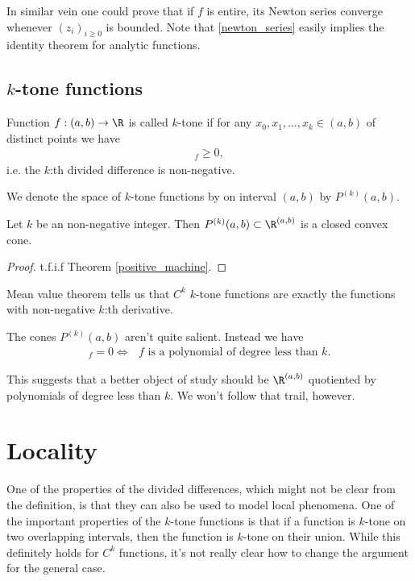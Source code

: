 In similar vein one could prove that if $f$ is entire, its Newton series converge whenever $(z_{i})_{i \geq 0}$ is bounded. Note that \ref{newton_series} easily implies the identity theorem for analytic functions.


\subsection{$k$-tone functions}

\begin{maar}
	Function $f : (a, b) \to \R$ is called $k$-tone if for any $x_{0}, x_{1}, \ldots, x_{k} \in (a, b)$ of distinct points we have
	\begin{align*}
		[x_{0}, x_{1}, \ldots, x_{k}]_{f} \geq 0,
	\end{align*}
	i.e. the $k$:th divided difference is non-negative.
\end{maar}

We denote the space of $k$-tone functions by on interval $(a, b)$ by $P^{(k)}(a, b)$.

\begin{lause}
	Let $k$ be an non-negative integer. Then $P^{(k)}(a, b) \subset \R^{(a, b)}$ is a closed convex cone.
\end{lause}
\begin{proof}
	t.f.i.f Theorem \ref{positive_machine}.
\end{proof}

Mean value theorem tells us that $C^{k}$ $k$-tone functions are exactly the functions with non-negative $k$:th derivative.

The cones $P^{(k)}(a, b)$ aren't quite salient. Instead we have
\begin{align*}
	[\cdot, \cdot, \ldots, \cdot]_{f} = 0 \Leftrightarrow \text{ $f$ is a polynomial of degree less than $k$}.
\end{align*}

This suggests that a better object of study should be $\R^{(a, b)}$ quotiented by polynomials of degree less than $k$. We won't follow that trail, however.

\section{Locality}

One of the properties of the divided differences, which might not be clear from the definition, is that they can also be used to model local phenomena. One of the important properties of the $k$-tone functions is that if a function is $k$-tone on two overlapping intervals, then the function is $k$-tone on their union. While this definitely holds for $C^{k}$ functions, it's not really clear how to change the argument for the general case.

